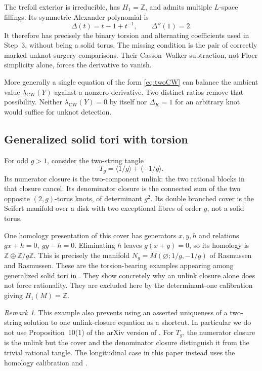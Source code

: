\documentclass[11pt]{amsart}
\theoremstyle{definition}
\theoremstyle{remark}
\newtheorem{remark}[theorem]{Remark}
\newcommand{\Z}{\mathbb Z}
\newcommand{\lCW}{\lambda_{\mathrm{CW}}}
\newcommand{\tang}[1]{\langle #1\rangle}
\begin{document}
The trefoil exterior is
irreducible, has
\(H_1=\Z\), and admits
multiple \(L\)-space
fillings. Its symmetric
Alexander polynomial is
\[
 \Delta(t)=t-1+t^{-1},
 \qquad \Delta''(1)=2.
\]
It therefore has precisely
the binary torsion and
alternating coefficients
used in Step~3, without
being a solid torus.
The missing condition is
the pair of correctly
marked unknot-surgery
comparisons. Their
Casson--Walker subtraction,
not Floer simplicity alone,
forces the derivative to
vanish.

More generally a single
equation of the form
\eqref{eq:twoCW} can balance
the ambient value
\(\lCW(Y)\) against a
nonzero derivative.
Two distinct ratios remove
that possibility. Neither
\(\lCW(Y)=0\) by itself nor
\(\Delta_K=1\) for an
arbitrary knot would
suffice for unknot detection.

\subsection{Generalized solid tori with torsion}

For odd \(g>1\), consider
the two-string tangle
\[
 T_g=\tang{1/g}+\tang{-1/g}.
\]
Its numerator closure is
the two-component unlink:
the two rational blocks
in that closure cancel.
Its denominator closure
is the connected sum of
the two opposite
\((2,g)\)-torus knots,
of determinant \(g^2\).
Its double branched cover
is the Seifert manifold
over a disk with two
exceptional fibres of
order \(g\), not a solid
torus.

One homology presentation
of this cover has
generators \(x,y,h\) and
relations
\(gx+h=0,\ gy-h=0\).
Eliminating \(h\) leaves
\(g(x+y)=0\), so its
homology is \(\Z\oplus
\Z/g\Z\). This is precisely the manifold \(N_g=M(\varnothing;1/g,-1/g)\)
of Rasmussen and Rasmussen. These are the
torsion-bearing examples
appearing among
generalized solid tori
in \cite[Section~7]{RR}.
They show concretely why
an unlink closure alone
does not force rationality.
They are excluded here
by the determinant-one
calibration giving
\(H_1(M)=\Z\).

\begin{remark}
This example also prevents
using an asserted
uniqueness of a
two-string solution to
one unlink-closure
equation as a shortcut.
In particular we do not
use Proposition~10(1)
of the arXiv version of
\cite{Sikora}. For
\(T_g\), the numerator
closure is the unlink
but the cover and the
denominator closure
distinguish it from the
trivial rational tangle.
The longitudinal case
in this paper instead
uses the homology
calibration and
\cite[Proposition~7.8]{RR}.
\end{remark}
\end{document}
